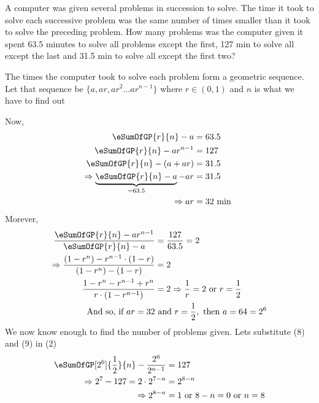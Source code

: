 

\question[5] A computer was given several problems in succession to solve. The time it took 
to solve each successive problem was the same number of times smaller than it took
to solve the preceding problem. How many problems was the computer given  it 
spent 63.5 minutes to solve all problems except the first, 127 min to solve all except
the last and 31.5 min to solve all except the first two?


\ifprintanswers
\fi 

\begin{solution}[\fullpage]
	The times the computer took to solve each problem form a geometric sequence. Let 
	that sequence be $\lbrace a, ar, ar^2 \ldots ar^{n-1}\rbrace$ where $r \in (0,1)$ and $n$
	is what we have to find out
	
	Now,
	\begin{align}
		\eSumOfGP{r}{n} - a &= 63.5 \\
		\eSumOfGP{r}{n} - ar^{n-1} &= 127 \\
		\eSumOfGP{r}{n} - (a + ar) &= 31.5 \\
		\Rightarrow \underbrace{\eSumOfGP{r}{n} - a}_{=63.5} - ar &= 31.5 \\
		\Rightarrow ar &= 32\text{ min }
	\end{align}
	Morever, 
	\begin{align}
		\dfrac{\eSumOfGP{r}{n} - ar^{n-1}}{\eSumOfGP{r}{n} - a} &= \frac{127}{63.5} = 2 \\
		\Rightarrow \dfrac{(1-r^n) - r^{n-1}\cdot(1-r)}{(1-r^n) - (1-r)} &= 2  \\
		\dfrac{1-r^n-r^{n-1}+r^n}{r\cdot(1-r^{n-1})} &= 2 \Rightarrow \dfrac{1}{r} = 2 
		\text{ or } r = \frac{1}{2} \\
		\text{And so, if } ar = 32 &\text{ and } r = \frac{1}{2}, \text{ then } a = 64 = 2^6
	\end{align}
	We now know enough to find the number of problems given. Lets substitute (8) and (9) in (2)
	\begin{align}
		\eSumOfGP[2^6]{\frac{1}{2}}{n}-\dfrac{2^6}{2^{n-1}} &= 127 \\
		\Rightarrow 2^7-127 = 2\cdot 2^{7-n} &= 2^{8-n} \\
		\Rightarrow 2^{8-n} &= 1 \text{ or } 8-n = 0 \text{ or } n = 8
	\end{align}
\end{solution}
